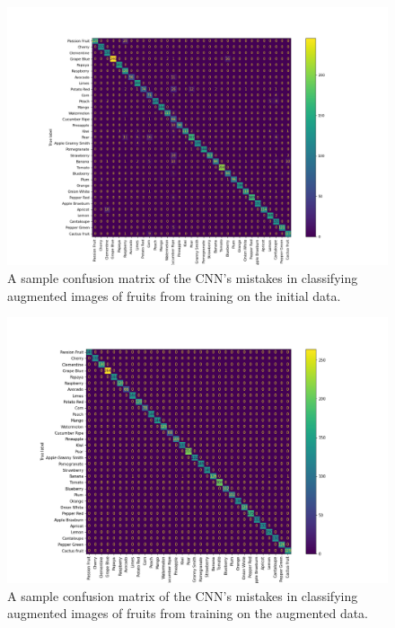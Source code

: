 \documentclass[11pt]{article}
\begin{document}
\begin{figure}[p]
\begin{center}
\includegraphics[scale=0.28]{conf_matr_2.png}
\end{center}
\caption{\centering A sample confusion matrix of the CNN's mistakes in classifying augmented images of fruits from training on the initial data.}
\label{Confusion Matrix}
\end{figure}
\begin{figure}[p]
\begin{center}
\includegraphics[scale=0.21]{conf_matr_3.png}
\end{center}
\caption{\centering A sample confusion matrix of the CNN's mistakes in classifying augmented images of fruits from training on the augmented data.}
\label{Confusion Matrix2}
\end{figure}
\clearpage
\end{document}

